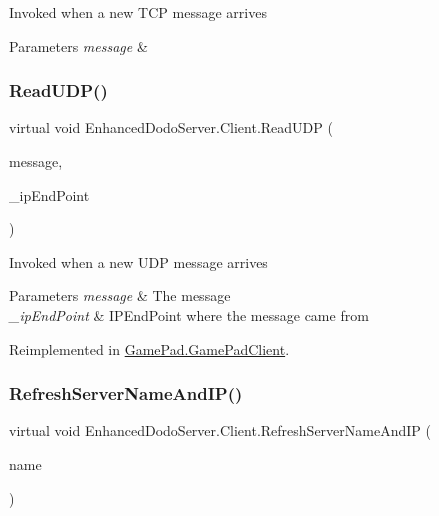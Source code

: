 Invoked when a new T\+CP message arrives 


\begin{DoxyParams}{Parameters}
{\em message} & \\
\hline
\end{DoxyParams}
\mbox{\label{class_enhanced_dodo_server_1_1_client_ab3e43c3998a31c73e1f3c0f98d0bf2e9}} 
\subsubsection{\texorpdfstring{ReadUDP()}{ReadUDP()}}
{\footnotesize\ttfamily virtual void Enhanced\+Dodo\+Server.\+Client.\+Read\+U\+DP (\begin{DoxyParamCaption}\item[{string}]{message,  }\item[{I\+P\+End\+Point}]{\+\_\+ip\+End\+Point }\end{DoxyParamCaption})\hspace{0.3cm}{\ttfamily [virtual]}}



Invoked when a new U\+DP message arrives 


\begin{DoxyParams}{Parameters}
{\em message} & The message\\
\hline
{\em \+\_\+ip\+End\+Point} & I\+P\+End\+Point where the message came from\\
\hline
\end{DoxyParams}


Reimplemented in \mbox{\hyperlink{class_game_pad_1_1_game_pad_client_a73e8617c4d3db915a54b5daefd7928af}{Game\+Pad.\+Game\+Pad\+Client}}.

\mbox{\label{class_enhanced_dodo_server_1_1_client_ad033acbfece943136bd6e7aed5cfdc8c}} 
\subsubsection{\texorpdfstring{RefreshServerNameAndIP()}{RefreshServerNameAndIP()}}
{\footnotesize\ttfamily virtual void Enhanced\+Dodo\+Server.\+Client.\+Refresh\+Server\+Name\+And\+IP (\begin{DoxyParamCaption}\item[{string}]{name }\end{DoxyParamCaption})\hspace{0.3cm}{\ttfamily [virtual]}}



